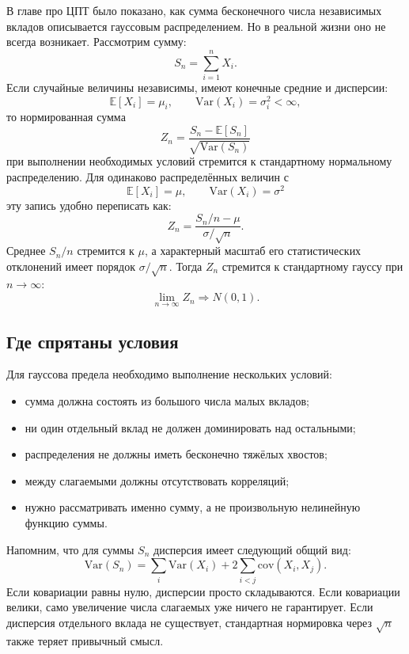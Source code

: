 \documentclass[
  russian,
  12pt,
  a4paper,
  a4paper,
  openany]{scrbook}
\providecommand{\tightlist}{%
  \setlength{\itemsep}{0pt}\setlength{\parskip}{0pt}}
\begin{document}
В главе про ЦПТ было показано, как сумма бесконечного числа независимых
вкладов описывается гауссовым распределением. Но в реальной жизни оно не
всегда возникает. Рассмотрим сумму: \[S_n=\sum_{i=1}^{n}X_i.\] Если
случайные величины независимы, имеют конечные средние и дисперсии:
\[\mathbb{E}[X_i]=\mu_i,
\qquad
\mathrm{Var}(X_i)=\sigma_i^2<\infty,\] то нормированная сумма \[Z_n=
\frac{S_n-\mathbb{E}[S_n]}
{\sqrt{\mathrm{Var}(S_n)}}\] при выполнении необходимых условий
стремится к стандартному нормальному распределению. Для одинаково
распределённых величин с \[\mathbb{E}[X_i]=\mu,
\qquad
\mathrm{Var}(X_i)=\sigma^2\] эту запись удобно переписать как: \[\boxed{
Z_n=
\frac{S_n/n-\mu}{\sigma/\sqrt n}.
}\] Среднее \(S_n/n\) стремится к \(\mu\), а характерный масштаб его
статистических отклонений имеет порядок \(\sigma/\sqrt n\). Тогда
\(Z_n\) стремится к стандартному гауссу при \(n \rightarrow \infty\):
\[\lim_{n\rightarrow\infty}Z_n\Rightarrow N(0,1).\]

\subsection{Где спрятаны
условия}\label{ux433ux434ux435-ux441ux43fux440ux44fux442ux430ux43dux44b-ux443ux441ux43bux43eux432ux438ux44f}

\begin{booknote}

Для гауссова предела необходимо выполнение нескольких условий:

\begin{itemize}
\tightlist
\item
  сумма должна состоять из большого числа малых вкладов;
\item
  ни один отдельный вклад не должен доминировать над остальными;
\item
  распределения не должны иметь бесконечно тяжёлых хвостов;
\item
  между слагаемыми должны отсутствовать корреляций;
\item
  нужно рассматривать именно сумму, а не произвольную нелинейную функцию
  суммы.
\end{itemize}

\end{booknote}

Напомним, что для суммы \(S_n\) дисперсия имеет следующий общий вид:
\[\mathrm{Var}(S_n)
=
\sum_i\mathrm{Var}(X_i)
+2\sum_{i<j}\mathrm{cov}(X_i,X_j).\] Если ковариации равны нулю,
дисперсии просто складываются. Если ковариации велики, само увеличение
числа слагаемых уже ничего не гарантирует. Если дисперсия отдельного
вклада не существует, стандартная нормировка через \(\sqrt n\) также
теряет привычный смысл.
\end{document}
